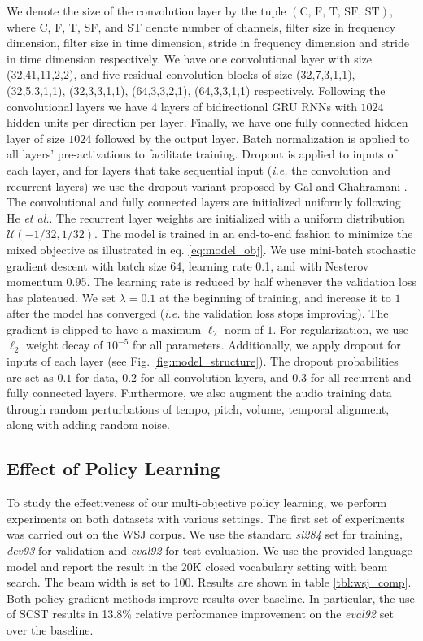 \documentclass{article}
\newcommand{\ie}{\emph{i.e.}\xspace}
\newcommand{\etal}{\emph{et al.}\xspace}
\begin{document}
We denote the size of the convolution layer by the tuple $(\text{C, F, T, SF, ST})$, where C, F, T, SF, and ST denote number of channels, filter size in frequency dimension, filter size in time dimension, stride in frequency dimension and stride in time dimension respectively. We have one convolutional layer with size (32,41,11,2,2), and five residual convolution blocks of size (32,7,3,1,1), (32,5,3,1,1), (32,3,3,1,1), (64,3,3,2,1), (64,3,3,1,1) respectively. Following
the convolutional layers we have 4 layers of bidirectional GRU RNNs with $1024$ hidden units per direction per layer. Finally, we have one fully connected hidden layer
of size $1024$ followed by the output layer. Batch normalization \cite{bn} is applied to all layers' pre-activations to facilitate training. 
Dropout \cite{dropout} is applied to inputs of each layer, and for layers that take sequential input (\ie the convolution and recurrent layers) we use the dropout variant proposed by Gal and Ghahramani \cite{gal2016theoretically}. The convolutional and fully connected layers are initialized uniformly following He \etal \cite{he2015delving}. The recurrent layer weights are initialized with a uniform distribution $\mathcal{U}(-1/32, 1/32)$. The model is trained in an end-to-end fashion to minimize the mixed objective as illustrated in eq. \ref{eq:model_obj}. We use mini-batch stochastic gradient descent with batch size 64, learning rate 0.1, and with Nesterov momentum 0.95. The learning rate is reduced by half whenever the validation loss has plateaued. 
We set $\lambda = 0.1$ at the beginning of training, and increase it to $1$ after the model has converged (\ie the validation loss stops improving). 
The gradient is clipped \cite{pascanu2013difficulty} to have a maximum $\ell_2$ norm of $1$.
For regularization, we use $\ell_2$ weight decay of $10^{-5}$ for all 
parameters. Additionally, we apply dropout for inputs of each layer (see Fig. \ref{fig:model_structure}). The dropout probabilities are set as $0.1$ for data, $0.2$ for all convolution layers, and $0.3$ for all recurrent and fully connected layers. Furthermore, we also augment the audio training data through random perturbations of tempo, pitch, volume, temporal alignment, along with adding random noise. 


\subsection{Effect of Policy Learning}
To study the effectiveness of our multi-objective policy learning, we perform experiments on both datasets with various settings. The first set of experiments was carried out on the WSJ corpus. We use the standard \emph{si284} set for training, \emph{dev93} for validation and \emph{eval92} for test evaluation. We use the provided language model and report the result in the 20K closed vocabulary setting with beam search. The beam width is set to 100. Results are shown in table \ref{tbl:wsj_comp}. Both policy gradient methods improve results over baseline. In particular, the use of SCST results in 13.8\% relative performance improvement on the \emph{eval92} set over the baseline.
\end{document}

